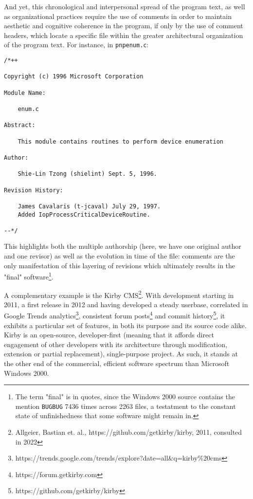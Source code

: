 And yet, this chronological and interpersonal spread of the program text, as well as organizational practices require the use of comments in order to maintain aesthetic and cognitive coherence in the program, if only by the use of comment headers, which locate a specific file within the greater architectural organization of the program text. For instance,  in \lstinline{pnpenum.c}:

\begin{lstlisting}[caption={enum.c}, label={enum.c}, float, floatplacement=H]
  /*++

Copyright (c) 1996 Microsoft Corporation

Module Name:

    enum.c

Abstract:

    This module contains routines to perform device enumeration

Author:

    Shie-Lin Tzong (shielint) Sept. 5, 1996.

Revision History:

    James Cavalaris (t-jcaval) July 29, 1997.
    Added IopProcessCriticalDeviceRoutine.

--*/
\end{lstlisting}

This highlights both the multiple authorship (here, we have one original author and one revisor) as well as the evolution in time of the file: comments are the only manifestation of this layering of revisions which ultimately results in the "final" software\footnote{The term "final" is in quotes, since the Windows 2000 source contains the mention \lstinline{BUGBUG} 7436 times across 2263 files, a testatment to the constant state of unfinishedness that some software might remain in.}.

A complementary example is the Kirby CMS\footnote{Allgeier, Bastian et. al., https://github.com/getkirby/kirby, 2011, consulted in 2022}. With development starting in 2011, a first release in 2012 and having developed a steady userbase, correlated in Google Trends analytics\footnote{https://trends.google.com/trends/explore?date=all\&q=kirby\%20cms}, consistent forum posts\footnote{https://forum.getkirby.com} and commit history\footnote{https://github.com/getkirby/kirby}, it exhibits a particular set of features, in both its purpose and its source code alike. Kirby is an open-source, developer-first (meaning that it affords direct engagement of other developers with its architecture through modification, extension or partial replacement), single-purpose project. As such, it stands at the other end of the commercial, efficient software spectrum than Microsoft Windows 2000.

